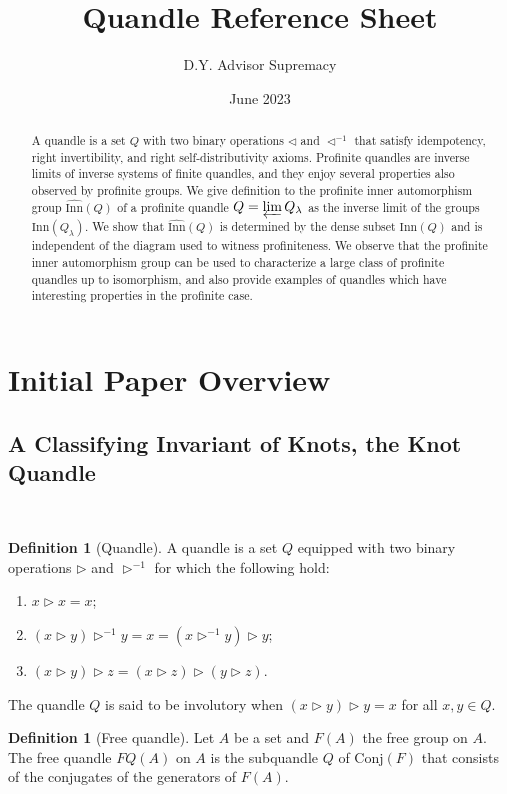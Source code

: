 \documentclass[reqno,dvipsnames]{amsart}
\title{Quandle Reference Sheet}
\author{D.Y. Advisor Supremacy}
\date{June 2023}
\newcommand{\tr}{\triangleright}
\newcommand{\Conj}{\text{Conj}}
\theoremstyle{definition}
\newtheorem{definition}[theorem]{Definition}
\begin{document}
\maketitle

\begin{abstract}
    A quandle is a set $Q$ with two binary operations $\triangleleft$ and $\triangleleft^{-1}$ that satisfy idempotency, right invertibility, and right self-distributivity axioms. Profinite quandles are inverse limits of inverse systems of finite quandles, and they enjoy several properties also observed by profinite groups. We give definition to the profinite inner automorphism group $\widehat{\text{Inn}}(Q)$ of a profinite quandle $Q=\varprojlim Q_\lambda$ as the inverse limit of the groups $\text{Inn}(Q_\lambda)$. We show that $\widehat{\text{Inn}}(Q)$ is determined by the dense subset $\text{Inn}(Q)$ and is independent of the diagram used to witness profiniteness. We observe that the profinite inner automorphism group can be used to characterize a large class of profinite quandles up to isomorphism, and also provide examples of quandles which have interesting properties in the profinite case.
\end{abstract}

\tableofcontents

\section{Initial Paper Overview}

\subsection{A Classifying Invariant of Knots, the Knot Quandle}~\cite{JOYCE198237}
\begin{definition}[Quandle]
A quandle is a set $Q$ equipped with two binary operations $\tr$ and $\tr^{-1}$ for which the following hold:
\begin{enumerate}
    \item $x\tr x=x$;
    \item $(x\tr y)\tr^{-1}y=x=(x\tr^{-1}y)\tr y$;
    \item $(x\tr y)\tr z=(x\tr z)\tr(y\tr z)$.
\end{enumerate}
The quandle $Q$ is said to be involutory when $(x\tr y)\tr y=x$ for all $x,y\in Q$.
\end{definition}

\begin{definition}[Free quandle]
Let $A$ be a set and $F(A)$ the free group on $A$. The free quandle $FQ(A)$ on $A$ is the subquandle $Q$ of $\Conj(F)$ that consists of the conjugates of the generators of $F(A)$.
\end{definition}
\end{document}

